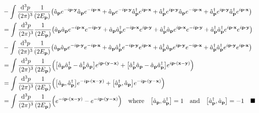 \documentclass{article}
\begin{document}
\begin{align*}
                                       & -\int\frac{\dd[3]{p}}{(2\pi)^3}\frac{1}{(2E_{\vb{p}})}\pqty{\hat{a}_{\vb{p}}e^{-i\vb{p}\vdot\vb{y}}\hat{a}_{\vb{p}}e^{-i\vb{p}\vdot\vb{x}}+\hat{a}_{\vb{p}}e^{-i\vb{p}\vdot\vb{y}}\hat{a}^\dagger_{\vb{p}}e^{i\vb{p}\vdot\vb{x}}+\hat{a}^\dagger_{\vb{p}}e^{i\vb{p}\vdot\vb{y}}\hat{a}_{\vb{p}}e^{-i\vb{p}\vdot\vb{x}}+\hat{a}^\dagger_{\vb{p}}e^{i\vb{p}\vdot\vb{y}}\hat{a}^\dagger_{\vb{p}}e^{i\vb{p}\vdot\vb{x}}} \\
                                       & =\int\frac{\dd[3]{p}}{(2\pi)^3}\frac{1}{(2E_{\vb{p}})}\pqty{\hat{a}_{\vb{p}}\hat{a}_{\vb{p}}e^{-i\vb{p}\vdot\vb{x}}e^{-i\vb{p}\vdot\vb{y}}+\hat{a}_{\vb{p}}\hat{a}^\dagger_{\vb{p}}e^{-i\vb{p}\vdot\vb{x}}e^{i\vb{p}\vdot\vb{y}}+\hat{a}^\dagger_{\vb{p}}\hat{a}_{\vb{p}}e^{i\vb{p}\vdot\vb{x}}e^{-i\vb{p}\vdot\vb{y}}+\hat{a}^\dagger_{\vb{p}}\hat{a}^\dagger_{\vb{p}}e^{i\vb{p}\vdot\vb{x}}e^{i\vb{p}\vdot\vb{y}}} \\
                                       & -\int\frac{\dd[3]{p}}{(2\pi)^3}\frac{1}{(2E_{\vb{p}})}\pqty{\hat{a}_{\vb{p}}\hat{a}_{\vb{p}}e^{-i\vb{p}\vdot\vb{y}}e^{-i\vb{p}\vdot\vb{x}}+\hat{a}_{\vb{p}}\hat{a}^\dagger_{\vb{p}}e^{-i\vb{p}\vdot\vb{y}}e^{i\vb{p}\vdot\vb{x}}+\hat{a}^\dagger_{\vb{p}}\hat{a}_{\vb{p}}e^{i\vb{p}\vdot\vb{y}}e^{-i\vb{p}\vdot\vb{x}}+\hat{a}^\dagger_{\vb{p}}\hat{a}^\dagger_{\vb{p}}e^{i\vb{p}\vdot\vb{y}}e^{i\vb{p}\vdot\vb{x}}} \\
                                       & =\int\frac{\dd[3]{p}}{(2\pi)^3}\frac{1}{(2E_{\vb{p}})}\pqty{\bqty{\hat{a}_{\vb{p}}\hat{a}^\dagger_{\vb{p}}-\hat{a}^\dagger_{\vb{p}}\hat{a}_{\vb{p}}}e^{i\vb{p}\vdot\pqty{\vb{y}-\vb{x}}}+\bqty{\hat{a}^\dagger_{\vb{p}}\hat{a}_{\vb{p}}-\hat{a}_{\vb{p}}\hat{a}^\dagger_{\vb{p}}}e^{i\vb{p}\vdot\pqty{\vb{x}-\vb{y}}}}                                                                                               \\
                                       & =\int\frac{\dd[3]{p}}{(2\pi)^3}\frac{1}{(2E_{\vb{p}})}\pqty{\bqty{\hat{a}_{\vb{p}},\hat{a}^\dagger_{\vb{p}}}e^{-i\vb{p}\vdot\pqty{\vb{x}-\vb{y}}}+\bqty{\hat{a}^\dagger_{\vb{p}},\hat{a}_{\vb{p}}          }e^{-i\vb{p}\vdot\pqty{\vb{y}-\vb{x}}}}                                                                                                                                                                   \\
                                       & =\int\frac{\dd[3]{p}}{(2\pi)^3}\frac{1}{(2E_{\vb{p}})}\pqty{e^{-i\vb{p}\vdot\pqty{\vb{x}-\vb{y}}}-e^{-i\vb{p}\vdot\pqty{\vb{y}-\vb{x}}}}\qq{where}\bqty{\hat{a}_{\vb{p}},\hat{a}^\dagger_{\vb{p}}}=1\qand \bqty{\hat{a}^\dagger_{\vb{p}},\hat{a}_{\vb{p}}          }=-1 \quad\blacksquare                                                                                                                            \\
\end{align*}
\pagebreak
\end{document}
